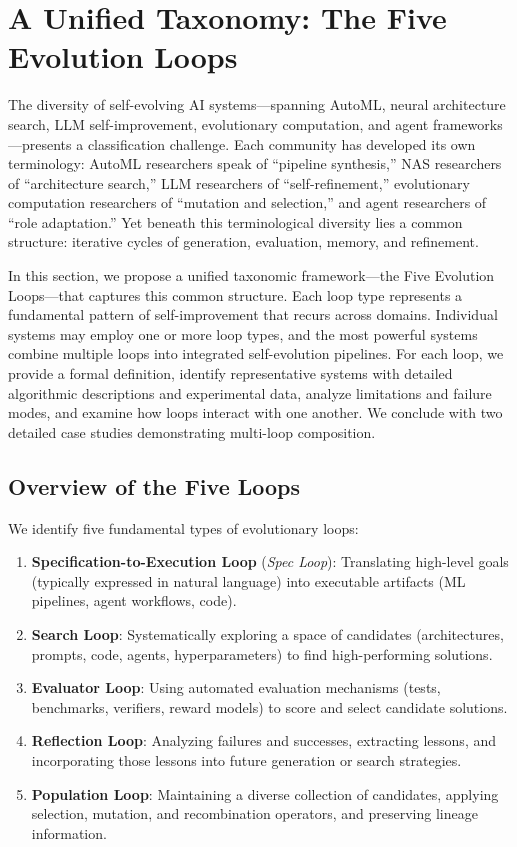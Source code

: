 \section{A Unified Taxonomy: The Five Evolution Loops}
\label{sec:taxonomy}

The diversity of self-evolving AI systems---spanning AutoML, neural architecture search, LLM self-improvement, evolutionary computation, and agent frameworks---presents a classification challenge. Each community has developed its own terminology: AutoML researchers speak of ``pipeline synthesis,'' NAS researchers of ``architecture search,'' LLM researchers of ``self-refinement,'' evolutionary computation researchers of ``mutation and selection,'' and agent researchers of ``role adaptation.'' Yet beneath this terminological diversity lies a common structure: iterative cycles of generation, evaluation, memory, and refinement.

In this section, we propose a unified taxonomic framework---the Five Evolution Loops---that captures this common structure. Each loop type represents a fundamental pattern of self-improvement that recurs across domains. Individual systems may employ one or more loop types, and the most powerful systems combine multiple loops into integrated self-evolution pipelines. For each loop, we provide a formal definition, identify representative systems with detailed algorithmic descriptions and experimental data, analyze limitations and failure modes, and examine how loops interact with one another. We conclude with two detailed case studies demonstrating multi-loop composition.

\subsection{Overview of the Five Loops}

We identify five fundamental types of evolutionary loops:

\begin{enumerate}
    \item \textbf{Specification-to-Execution Loop} (\emph{Spec Loop}): Translating high-level goals (typically expressed in natural language) into executable artifacts (ML pipelines, agent workflows, code).
    \item \textbf{Search Loop}: Systematically exploring a space of candidates (architectures, prompts, code, agents, hyperparameters) to find high-performing solutions.
    \item \textbf{Evaluator Loop}: Using automated evaluation mechanisms (tests, benchmarks, verifiers, reward models) to score and select candidate solutions.
    \item \textbf{Reflection Loop}: Analyzing failures and successes, extracting lessons, and incorporating those lessons into future generation or search strategies.
    \item \textbf{Population Loop}: Maintaining a diverse collection of candidates, applying selection, mutation, and recombination operators, and preserving lineage information.
\end{enumerate}

